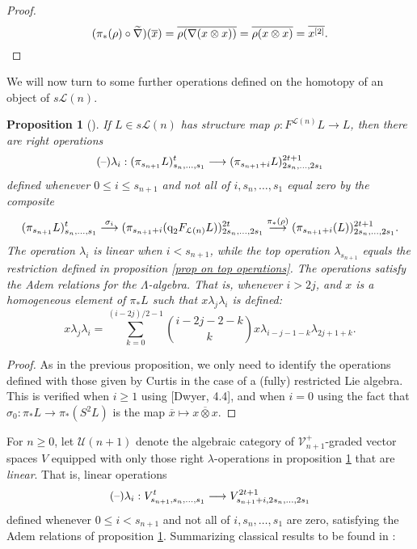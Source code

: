 \documentclass[11pt]{amsart}
\theoremstyle{plain}
\newtheorem{prop}[thm]{Proposition}
\theoremstyle{definition}
\newcommand{\DASH}{\textup{--}}
\renewcommand{\to}{\longrightarrow}
\newcommand{\calU}{\mathcal{U}}
\newcommand{\calL}{\mathcal{L}}
\newcommand{\calV}{\mathcal{V}}
\theoremstyle{plain}
\newcommand{\restn}[1]{#1^{[2]}}
\newcommand{\vect}[2]{\calV^{#1}_{#2}}
\newcommand{\quadgrad}[1]{\textup{q}_{#1}}
\begin{document}
\begin{homotopy operations for PRLs}
\begin{proof}
\[(\pi_*(\rho)\circ\widetilde{\nabla})(\overline{x})=\overline{\rho(\nabla(x\otimes x))}=\overline{\rho(x\otimes x)}=\overline{\restn{x}}.\qedhere\]
\end{proof}
We will now turn to some further operations defined on the homotopy of an object of $s\calL(n)$.
\begin{prop}[\cite{CurtisSimplicialHtpy.pdf,6Author.pdf}]\label{linear operations on homotopy of lie alg}
If $L\in s\calL(n)$ has structure map $\rho:F^{\calL(n)}L\to L$, then there are right operations
\[(\DASH)\lambda_i:(\pi_{s_{n+1}}L)_{s_n,\ldots,s_1}^t\to (\pi_{s_{n+1}+i}L)_{2s_n,\ldots,2s_1}^{2t+1}\]
defined whenever $0\leq i\leq s_{n+1}$ and not all of $i,s_n,\ldots,s_1$ equal zero by the composite
\[(\pi_{s_{n+1}}L)_{s_n,\ldots,s_1}^t\overset{\sigma_i}{\to}(\pi_{s_{n+1}+i}(\quadgrad{2}F_{\calL(n)}L))_{2s_n,\ldots,2s_1}^{2t}\overset{\pi_*(\rho)}{\to}(\pi_{s_{n+1}+i}(L))_{2s_n,\ldots,2s_1}^{2t+1}.\]
The operation $\lambda_i$ is linear when $i<s_{n+1}$, while the top operation $\lambda_{s_{n+1}}$ equals the restriction defined in proposition \ref{prop on top operations}. The operations satisfy the Adem relations for the $\Lambda$-algebra. That is, whenever $i>2j$, and $x$ is a homogeneous element of $\pi_*L$ such that $x\lambda_j\lambda_i$ is defined:
\[x\lambda_j\lambda_i=\sum_{k=0}^{(i-2j)/2-1}{i-2j-2-k\choose k}x\lambda_{i-j-1-k}\lambda_{2j+1+k}.\]
\end{prop}
\begin{proof}
As in the previous proposition, we only need to identify the operations defined with those given by Curtis in the case of a (fully) restricted Lie algebra. This is verified when $i\geq1$ using [Dwyer, 4.4], and when $i=0$ using the fact that $\sigma_0:\pi_*L\to \pi_*(S^2L)$ is the map $\overline{x}\mapsto\overline{x\otimes x}$.
\end{proof}
For $n\geq0$, let $\calU(n+1)$ denote the algebraic category of $\vect{+}{n+1}$-graded vector spaces $V$ equipped with only those right $\lambda$-operations in proposition \ref{linear operations on homotopy of lie alg} that are \emph{linear}. That is, linear operations 
\[(\DASH)\lambda_i:V_{s_{n+1},s_n,\ldots,s_1}^t\to V_{s_{n+1}+i,2s_n,\ldots,2s_1}^{2t+1}\]
defined whenever $0\leq i< s_{n+1}$ and not all of $i,s_{n},\ldots,s_{1}$ are zero, satisfying the Adem relations of proposition \ref{linear operations on homotopy of lie alg}. Summarizing classical results to be found in \cite{CurtisSimplicialHtpy.pdf}:


\end{homotopy operations for PRLs}
\end{document}
